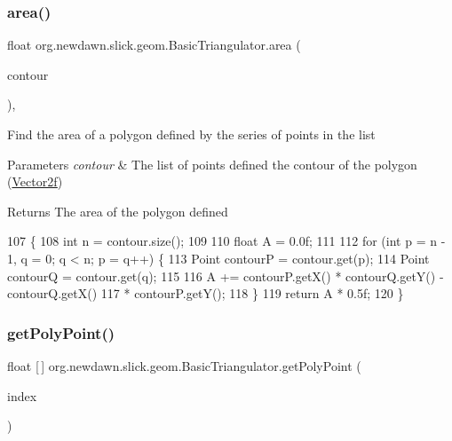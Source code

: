 \subsubsection{\texorpdfstring{area()}{area()}}
{\footnotesize\ttfamily float org.\+newdawn.\+slick.\+geom.\+Basic\+Triangulator.\+area (\begin{DoxyParamCaption}\item[{\mbox{\hyperlink{classorg_1_1newdawn_1_1slick_1_1geom_1_1_basic_triangulator_1_1_point_list}{Point\+List}}}]{contour }\end{DoxyParamCaption})\hspace{0.3cm}{\ttfamily [inline]}, {\ttfamily [private]}}

Find the area of a polygon defined by the series of points in the list


\begin{DoxyParams}{Parameters}
{\em contour} & The list of points defined the contour of the polygon (\mbox{\hyperlink{classorg_1_1newdawn_1_1slick_1_1geom_1_1_vector2f}{Vector2f}}) \\
\hline
\end{DoxyParams}
\begin{DoxyReturn}{Returns}
The area of the polygon defined 
\end{DoxyReturn}

\begin{DoxyCode}
107                                           \{
108         \textcolor{keywordtype}{int} n = contour.size();
109 
110         \textcolor{keywordtype}{float} A = 0.0f;
111 
112         \textcolor{keywordflow}{for} (\textcolor{keywordtype}{int} p = n - 1, q = 0; q < n; p = q++) \{
113             Point contourP = contour.get(p);
114             Point contourQ = contour.get(q);
115 
116             A += contourP.getX() * contourQ.getY() - contourQ.getX()
117                     * contourP.getY();
118         \}
119         \textcolor{keywordflow}{return} A * 0.5f;
120     \}
\end{DoxyCode}
\mbox{\label{classorg_1_1newdawn_1_1slick_1_1geom_1_1_basic_triangulator_a63c53a60771863deae6ed9b39a385e22}} 
\subsubsection{\texorpdfstring{get\+Poly\+Point()}{getPolyPoint()}}
{\footnotesize\ttfamily float \mbox{[}$\,$\mbox{]} org.\+newdawn.\+slick.\+geom.\+Basic\+Triangulator.\+get\+Poly\+Point (\begin{DoxyParamCaption}\item[{int}]{index }\end{DoxyParamCaption})\hspace{0.3cm}{\ttfamily [inline]}}

